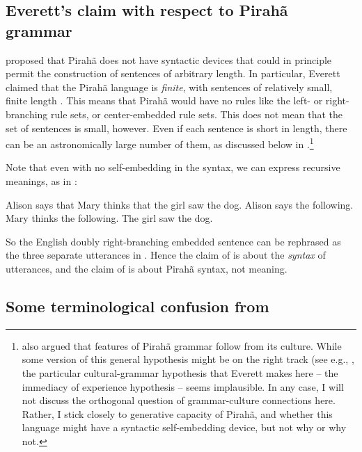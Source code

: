 \documentclass[output=paper]{langscibook}
\begin{document}
\subsection{Everett's claim with respect to Pirahã grammar}

\citet{everett2005cultural} proposed that Pirahã does not have syntactic devices that could in principle permit the construction of sentences of arbitrary length. In particular, Everett claimed that the Pirahã language is \textit{finite}, with sentences of relatively small, finite length \citep{everett2012does}. This means that Pirahã would have no rules like the left- or right-branching rule sets, or center-embedded rule sets.  This does not mean that the set of sentences is small, however.  Even if each sentence is short in length, there can be an astronomically large number of them, as discussed below in .\footnote{\citet{everett2005cultural} also argued that features of Pirahã grammar follow from its culture.  While some version of this general hypothesis might be on the right track (see e.g., \citet{gil2021tense}, the particular cultural-grammar hypothesis that Everett makes here -- the immediacy of experience hypothesis -- seems implausible.  In any case, I will not discuss the orthogonal question of grammar-culture connections here.  Rather, I stick closely to generative capacity of Pirahã, and whether this language might have a syntactic  self-embedding device, but not why or why not.}

Note that even with no self-embedding in the syntax, we can express recursive meanings, as in :

\eal
\label{rec_meaning}
\ex \label{rec_meaning1} Alison says that Mary thinks that the girl saw the dog.
\ex \label{rec_meaning2} Alison says the following. Mary thinks the following. The girl saw the dog.
\zl

\noindent
So the English doubly right-branching embedded sentence  can be rephrased as the three separate utterances in . 
 Hence the claim of \citet{hauser2002faculty} is about the \textit{syntax} of utterances, and the claim of \citet{everett2005cultural} is about Pirahã syntax, not meaning.

\subsection{Some terminological confusion from \citet{nevins2009evidence}}
\end{document}
